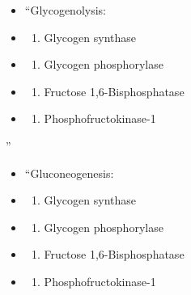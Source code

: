\documentclass[
]{book}
\providecommand{\tightlist}{%
  \setlength{\itemsep}{0pt}\setlength{\parskip}{0pt}}
\begin{document}
\begin{itemize}
\item
  ``Glycogenolysis:
\item
  \begin{enumerate}
  \def\labelenumi{(\Alph{enumi})}
  \tightlist
  \item
    Glycogen synthase\\
  \end{enumerate}
\item
  \begin{enumerate}
  \def\labelenumi{(\Alph{enumi})}
  \setcounter{enumi}{1}
  \tightlist
  \item
    Glycogen phosphorylase\\
  \end{enumerate}
\item
  \begin{enumerate}
  \def\labelenumi{(\Alph{enumi})}
  \setcounter{enumi}{2}
  \tightlist
  \item
    Fructose 1,6-Bisphosphatase\\
  \end{enumerate}
\item
  \begin{enumerate}
  \def\labelenumi{(\Alph{enumi})}
  \setcounter{enumi}{3}
  \tightlist
  \item
    Phosphofructokinase-1
  \end{enumerate}
\end{itemize}

''

\begin{itemize}
\item
  ``Gluconeogenesis:
\item
  \begin{enumerate}
  \def\labelenumi{(\Alph{enumi})}
  \tightlist
  \item
    Glycogen synthase\\
  \end{enumerate}
\item
  \begin{enumerate}
  \def\labelenumi{(\Alph{enumi})}
  \setcounter{enumi}{1}
  \tightlist
  \item
    Glycogen phosphorylase\\
  \end{enumerate}
\item
  \begin{enumerate}
  \def\labelenumi{(\Alph{enumi})}
  \setcounter{enumi}{2}
  \tightlist
  \item
    Fructose 1,6-Bisphosphatase\\
  \end{enumerate}
\item
  \begin{enumerate}
  \def\labelenumi{(\Alph{enumi})}
  \setcounter{enumi}{3}
  \tightlist
  \item
    Phosphofructokinase-1
  \end{enumerate}
\end{itemize}
\end{document}
